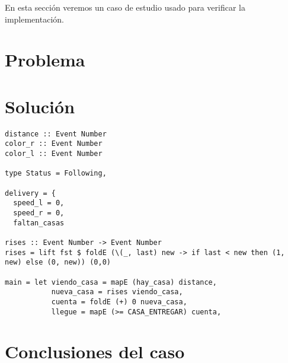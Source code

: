
  En esta sección veremos un caso de estudio usado para verificar la
implementación.

\section {Problema}

\section {Solución}

\begin{verbatim}
distance :: Event Number
color_r :: Event Number
color_l :: Event Number

type Status = Following, 

delivery = {
  speed_l = 0,
  speed_r = 0,
  faltan_casas

rises :: Event Number -> Event Number
rises = lift fst $ foldE (\(_, last) new -> if last < new then (1, new) else (0, new)) (0,0)

main = let viendo_casa = mapE (hay_casa) distance,
           nueva_casa = rises viendo_casa,
           cuenta = foldE (+) 0 nueva_casa,
           llegue = mapE (>= CASA_ENTREGAR) cuenta,

\end{verbatim}

\section {Conclusiones del caso}


